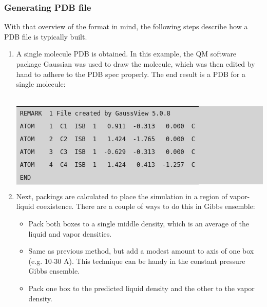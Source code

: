 \subsubsection{Generating PDB file}
With that overview of the format in mind, the following steps describe how a PDB file is typically built.\\
\begin{enumerate}
\item A single molecule PDB is obtained. In this example, the QM software package Gaussian was used to draw the molecule, which was then edited by hand to adhere to the PDB spec properly. The end result is a PDB for a single molecule:\\\\
\colorbox{lightgray}{
\begin{tabular}{l *8r }
  \texttt{REMARK} & \multicolumn{8}{l}{\texttt{1 File created by GaussView 5.0.8}}  \\
  \texttt{ATOM} & \texttt{1} & \texttt{C1} & \texttt{ISB} & \texttt{1} & \texttt{0.911} & \texttt{-0.313} & \texttt{0.000} & \texttt{C} \\
  \texttt{ATOM} & \texttt{2} & \texttt{C2} & \texttt{ISB} & \texttt{1} & \texttt{1.424} & \texttt{-1.765} & \texttt{0.000} & \texttt{C} \\
  \texttt{ATOM} & \texttt{3} & \texttt{C3} & \texttt{ISB} & \texttt{1} & \texttt{-0.629} & \texttt{-0.313} & \texttt{0.000} & \texttt{C} \\
  \texttt{ATOM} & \texttt{4} & \texttt{C4} & \texttt{ISB} & \texttt{1} & \texttt{1.424} & \texttt{0.413} & \texttt{-1.257} & \texttt{C} \\
  \multicolumn{9}{l}{\texttt{END}} \\
\end{tabular}
}
\item Next, packings are calculated to place the simulation in a region of vapor-liquid coexistence. There are a couple of ways to do this in Gibbs ensemble:
\begin{itemize}
\item Pack both boxes to a single middle density, which is an average of the liquid and vapor densities.
\item Same as previous method, but add a modest amount to axis of one box (e.g. 10-30 A).  This technique can be handy in the constant pressure Gibbs ensemble.
\item Pack one box to the predicted liquid density and the other to the vapor density.
\end{itemize}

\end{enumerate}
